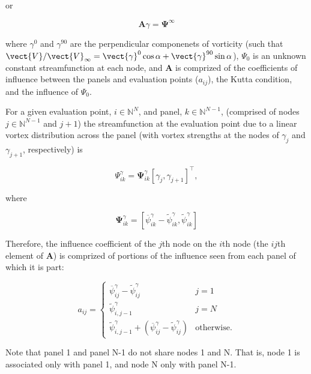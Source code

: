 \noindent or

\begin{equation}
	\mathbf{A} \gamma = \mathbf{\Psi}^\infty
\end{equation}

\noindent where \(\gamma^0\) and \(\gamma^{90}\) are the perpendicular componenets of vorticity (such that \(\vect{V}/\vect{V}_\infty = \vect{\gamma}^0 \cos\alpha + \vect{\gamma}^{90} \sin\alpha\)), \(\Psi_0\) is an unknown constant streamfunction at each node, and  \(\mathbf{A}\) is comprized of the coefficients of influence between the panels and evaluation points (\(a_{ij}\)), the Kutta condition, and the influence of \(\Psi_0\).

For a given evaluation point, \(i \in \mathbb{N}^N\), and panel, \(k \in \mathbb{N}^{N-1}\), (comprised of nodes \(j \in \mathbb{N}^{N-1}\) and \(j+1\)) the streamfunction at the evaluation point due to a linear vortex distribution across the panel (with vortex strengths at the nodes of \(\gamma_j\) and \(\gamma_{j+1}\), respectively) is

\begin{equation}
	\Psi_{ik}^\gamma = \mathbf{\Psi}^\gamma_{ik} [\gamma_j, \gamma_{j+1}]^\top,
\end{equation}

\noindent where

\begin{equation}
	\mathbf{\Psi}^\gamma_{ik} = \left[\overline{\psi}^\gamma_{ik} - \widetilde{\psi}^\gamma_{ik}, \widetilde{\psi}^\gamma_{ik} \right]
\end{equation}

\noindent Therefore, the influence coefficient of the \(j\)th node on the \(i\)th node (the \(ij\)th element of \(\mathbf{A}\)) is comprized of portions of the influence seen from each panel of which it is part:

\begin{equation}
	a_{ij} = \begin{cases}
		\overline{\psi}^\gamma_{ij} -  \widetilde{\psi}^\gamma_{ij} & j = 1 \\
		\widetilde{\psi}^\gamma_{i,j-1} & j = N \\
		\widetilde{\psi}^\gamma_{i,j-1} + \left(\overline{\psi}^\gamma_{ij} -  \widetilde{\psi}^\gamma_{ij}\right) & \mathrm{otherwise}.
	\end{cases}
\end{equation}

\noindent Note that panel 1 and panel N-1 do not share nodes 1 and N. That is, node 1 is associated only with panel 1, and node N only with panel N-1. 



